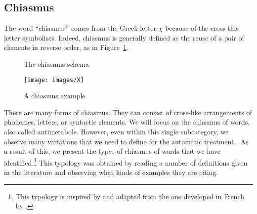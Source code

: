 \subsection{Chiasmus}
\label{secChiasmus}
The word ``chiasmus'' comes from the Greek letter $\chi$ because of the cross this letter symbolises. Indeed, chiasmus is generally defined as the reuse of a pair of elements in reverse order, as in Figure~\ref{crossSchem1}.
\vspace{0.2cm}%
\begin{figure}[H] 
\begin{center}
\end{center}
\vspace{-0.3cm}
\caption{The chiasmus schema \label{crossSchem1}} 
\end{figure}
\vspace{-0.5cm}
\begin{figure}[h!] 
\begin{center}
\texttt{[image: images/X]}
\vspace{-0.4cm}
\caption{A chiasmus example\label{graphX}}
\end{center}
\end{figure}%
\vspace{-0.1cm}
\noindent
There are many forms of chiasmus. They can consist of cross-like arrangements of phonemes, letters, or syntactic elements. We will focus on the chiasmus of words, also called antimetabole. However, even within this single subcategory, we observe many variations that we need to define for the automatic treatment \citep{gawr}. As a result of this, we present the types of chiasmus of words that we have identified.\footnote{This typology is inspired by and adapted from the one developed in French by \cite{dubremetz2013}.} This typology was obtained by reading a number of
definitions given in the literature \citep{Diderot1789,gradus,garcia,greene2012,larousse,Nordahl1971,
rabatel,Vandendorpe1991,VanGorp2001} and observing what kinds of examples they are citing.
\clearpage



